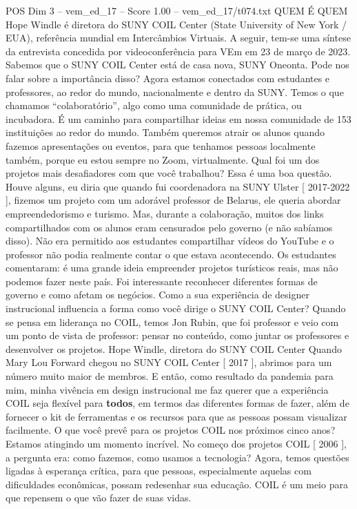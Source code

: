 \begin{textsample}{POS Dim 3 – vem\_ed\_17 – Score 1.00 – vem\_ed\_17/t074.txt}  \label{ex:f3_pos_064}
QUEM É QUEM Hope Windle é diretora do SUNY COIL Center (State University of New York / EUA), referência mundial em Intercâmbios Virtuais.
A seguir, tem-se uma síntese da entrevista concedida por videoconferência para VEm em 23 de março de 2023.
Sabemos que o SUNY COIL Center está de casa nova, SUNY Oneonta.
Pode nos falar sobre a importância disso?
Agora estamos conectados com estudantes e professores, ao redor do mundo, nacionalmente e dentro da SUNY.
Temos o que chamamos “colaboratório”, algo como uma comunidade de prática, ou incubadora.
É um caminho para compartilhar ideias em nossa comunidade de 153 instituições ao redor do mundo.
Também queremos atrair os alunos quando fazemos apresentações ou eventos, para que tenhamos pessoas localmente também, porque eu estou sempre no Zoom, virtualmente.
Qual foi um dos projetos mais desafiadores com que você trabalhou?
Essa é uma boa questão.
Houve alguns, eu diria que quando fui coordenadora na SUNY Ulster [ 2017-2022 ], fizemos um projeto com um adorável professor de Belarus, ele queria abordar empreendedorismo e turismo.
Mas, durante a colaboração, muitos dos links compartilhados com os alunos eram censurados pelo governo (e não sabíamos disso).
Não era permitido aos estudantes compartilhar vídeos do YouTube e o professor não podia realmente contar o que estava acontecendo.
Os estudantes comentaram: é uma grande ideia empreender projetos turísticos reais, mas não podemos fazer neste país.
Foi interessante reconhecer diferentes formas de governo e como afetam os negócios.
Como a sua experiência de designer instrucional influencia a forma como você dirige o SUNY COIL Center?
Quando se pensa em liderança no COIL, temos Jon Rubin, que foi professor e veio com um ponto de vista de professor: pensar no conteúdo, como juntar os professores e desenvolver os projetos.
Hope Windle, diretora do SUNY COIL Center Quando Mary Lou Forward chegou no SUNY COIL Center [ 2017 ], abrimos para um número muito maior de membros.
E então, como resultado da pandemia para mim, minha vivência em design instrucional me faz querer que a experiência COIL seja flexível para \textbf{todos}, em termos das diferentes formas de fazer, além de fornecer o kit de ferramentas e os recursos para que as pessoas possam visualizar facilmente.
O que você prevê para os projetos COIL nos próximos cinco anos?
Estamos atingindo um momento incrível.
No começo dos projetos COIL [ 2006 ], a pergunta era: como fazemos, como usamos a tecnologia?
Agora, temos questões ligadas à esperança crítica, para que pessoas, especialmente aquelas com dificuldades econômicas, possam redesenhar sua educação.
COIL é um meio para que repensem o que vão fazer de suas vidas.

\end{textsample}
